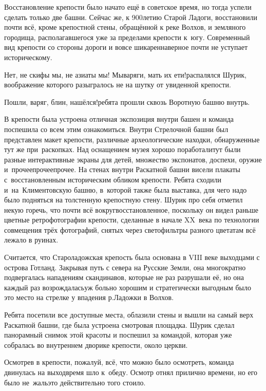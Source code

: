 Восстановление крепости было начато ещё в советское время, но тогда успели сделать только две башни. Сейчас же, к 900\sdash летию Старой Ладоги, восстановили почти всё, кроме крепостной стены, обращённой к реке Волхов, и земляного городища, располагавшегося уже за пределами крепости к~югу. Современный вид крепости со стороны дороги и вовсе шикарен\mdash наверное почти не уступает историческому. 

\diagdash Нет, не скифы мы, не азиаты мы! Мы\mdash варяги, мать их ети!\mdash распалялся Шурик, воображение которого разыгралось не на шутку от увиденной крепости.

\diagdash Пошли, варяг, блин, нашёлся!\mdash ребята прошли сквозь Воротную башню внутрь.

В крепости была устроена отличная экспозиция внутри башен и команда поспешила со всем этим ознакомиться. Внутри Стрелочной башни был представлен макет крепости, различные археологические находки, обнаруженные тут же при~раскопках. Над оснащением музея хорошо поработали\mdash тут были разные интерактивные экраны для детей, множество экспонатов, доспехи, оружие и~прочее\sdash прочее\sdash прочее. На стенах внутри Раскатной башни висели плакаты с~восстановленным историческим обликом крепости. Ребята сходили и~на~Климентовскую башню, в~которой также была выставка, для чего надо было подняться на толстенную крепостную стену. Шурик про себя отметил некую горечь, что почти всё вокруг\mdash восстановленное, поскольку он видел раньше цветные ретро\sdash фотографии крепости, сделанные в начале XX~века по технологии совмещения трёх фотографий, снятых через светофильтры разного цвета\cite{ПрокудинГорский}\mdash там всё лежало в руинах.

Считается, что Староладожская крепость была основана в VIII веке выходцами с острова Готланд\cite{ЛебедевЛадога}. Закрывая путь с севера на Русские Земли, она многократно подвергалась нападениям скандинавов, которые не раз разрушали её, но она каждый раз возрождалась\mdash уж больно хорошим и стратегически выгодным было это место на стрелке у впадения р.\thinspace Ладожки в Волхов.

Ребята посетили все доступные места, облазили стены и вышли на самый верх Раскатной башни, где была устроена смотровая площадка. Шурик сделал панорамный снимок этой красоты и поспешил за командой, которая уже собралась во внутреннем дворике крепости, около церкви.

Осмотрев в крепости, пожалуй, всё, что можно было осмотреть, команда двинулась на выход\mdash время шло к~обеду. Осмотр отнял прилично времени, но его было не~жаль\mdash это действительно того стоило. 

